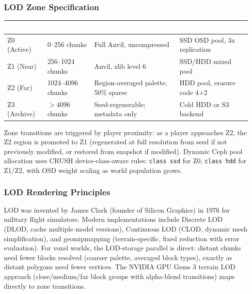 \documentclass[11pt,letterpaper]{article}
\newcommand{\tableheader}[1]{\textbf{\sffamily\textcolor{white}{#1}}}
\begin{document}
\subsubsection{LOD Zone Specification}

\begin{center}
\begin{tabularx}{\textwidth}{L{2cm}L{3cm}L{3cm}X}
\toprule
{}
\tableheader{Zone} & \tableheader{Radius} & \tableheader{Storage Format} & \tableheader{Ceph Allocation} \\
\midrule
Z0 (Active) & 0--256 chunks & Full Anvil, uncompressed & SSD OSD pool, 3x replication \\
Z1 (Near) & 256--1024 chunks & Anvil, zlib level 6 & SSD/HDD mixed pool \\
Z2 (Far) & 1024--4096 chunks & Region-averaged palette, 50\% sparse & HDD pool, erasure code 4+2 \\
Z3 (Archive) & $>$4096 chunks & Seed-regenerable; metadata only & Cold HDD or S3 backend \\
\bottomrule
\end{tabularx}
\end{center}

Zone transitions are triggered by player proximity: as a player approaches Z2, the Z2 region is promoted to Z1 (regenerated at full resolution from seed if not previously modified, or restored from snapshot if modified). Dynamic Ceph pool allocation uses CRUSH device-class-aware rules: \texttt{class ssd} for Z0, \texttt{class hdd} for Z1/Z2, with OSD weight scaling as world population grows.

\subsubsection{LOD Rendering Principles}

LOD was invented by James Clark (founder of Silicon Graphics) in 1976 for military flight simulators. Modern implementations include Discrete LOD (DLOD, cache multiple model versions), Continuous LOD (CLOD, dynamic mesh simplification), and geomipmapping (terrain-specific, fixed reduction with error evaluation). For voxel worlds, the LOD-storage parallel is direct: distant chunks need fewer blocks resolved (coarser palette, averaged block types), exactly as distant polygons need fewer vertices. The NVIDIA GPU Gems 3 terrain LOD approach (close/medium/far block groups with alpha-blend transitions) maps directly to zone transitions.
\end{document}
